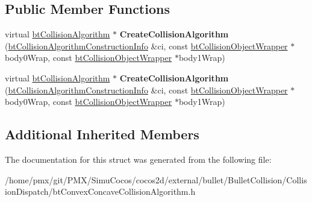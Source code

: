 \subsection*{Public Member Functions}
\begin{DoxyCompactItemize}
\item 
\mbox{\label{structbtConvexConcaveCollisionAlgorithm_1_1SwappedCreateFunc_aa2126d3c63069571fb58ff4812322a87}} 
virtual \hyperlink{classbtCollisionAlgorithm}{bt\+Collision\+Algorithm} $\ast$ {\bfseries Create\+Collision\+Algorithm} (\hyperlink{structbtCollisionAlgorithmConstructionInfo}{bt\+Collision\+Algorithm\+Construction\+Info} \&ci, const \hyperlink{structbtCollisionObjectWrapper}{bt\+Collision\+Object\+Wrapper} $\ast$body0\+Wrap, const \hyperlink{structbtCollisionObjectWrapper}{bt\+Collision\+Object\+Wrapper} $\ast$body1\+Wrap)
\item 
\mbox{\label{structbtConvexConcaveCollisionAlgorithm_1_1SwappedCreateFunc_aa2126d3c63069571fb58ff4812322a87}} 
virtual \hyperlink{classbtCollisionAlgorithm}{bt\+Collision\+Algorithm} $\ast$ {\bfseries Create\+Collision\+Algorithm} (\hyperlink{structbtCollisionAlgorithmConstructionInfo}{bt\+Collision\+Algorithm\+Construction\+Info} \&ci, const \hyperlink{structbtCollisionObjectWrapper}{bt\+Collision\+Object\+Wrapper} $\ast$body0\+Wrap, const \hyperlink{structbtCollisionObjectWrapper}{bt\+Collision\+Object\+Wrapper} $\ast$body1\+Wrap)
\end{DoxyCompactItemize}
\subsection*{Additional Inherited Members}


The documentation for this struct was generated from the following file\+:\begin{DoxyCompactItemize}
\item 
/home/pmx/git/\+P\+M\+X/\+Simu\+Cocos/cocos2d/external/bullet/\+Bullet\+Collision/\+Collision\+Dispatch/bt\+Convex\+Concave\+Collision\+Algorithm.\+h\end{DoxyCompactItemize}
